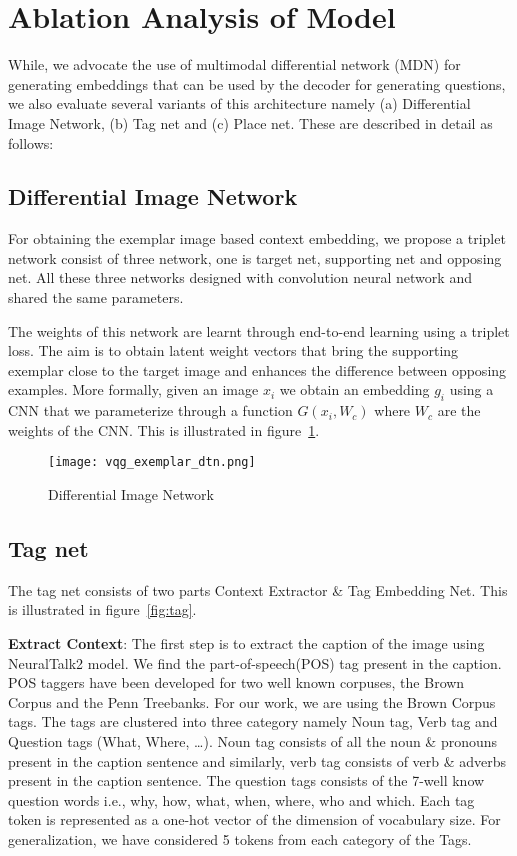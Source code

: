 \documentclass[11pt,a4paper]{article}
\begin{document}
\section{Ablation Analysis of Model}

\label{sec-4}
 While,  we  advocate  the  use  of  multimodal  differential network (MDN) for generating embeddings that can be used by the decoder for generating questions, we also evaluate several variants of this architecture namely (a) Differential Image Network, (b) Tag net and  (c) Place net. These are described in detail as follows:

\subsection{Differential Image Network}


For obtaining the exemplar image based context embedding, we propose a triplet network consist of three network, one is target net, supporting net and opposing net.  All these three networks designed with convolution neural network and shared the same parameters.

The weights of this network are learnt through end-to-end learning using  a triplet loss.  The aim is to obtain latent weight vectors that bring the supporting exemplar close to the target image  and enhances the difference between opposing examples.  More formally, given an image $x_i$ we obtain an embedding $g_i$ using a CNN that we parameterize through a function $G(x_i,W_c)$ where $W_c$ are the weights of the CNN. This is illustrated in  figure~\ref{fig:DTN}.   
\begin{figure}[ht]
\centering
\texttt{[image: vqg\_exemplar\_dtn.png]}
	\caption{ Differential Image Network }
	\label{fig:DTN}
\end{figure}










\subsection{Tag net}
\label{sec:tag}
The tag net consists of two parts Context Extractor \& Tag Embedding Net. This is illustrated in figure~\ref{fig:tag}.

\textbf{Extract Context}:
The first step is to extract the caption of the image using NeuralTalk2 \cite{Karpathy_NIPS2014} model. We find the part-of-speech(POS) tag present in the caption. POS taggers have been developed for two well known corpuses, the Brown Corpus and the Penn Treebanks. For our work, we are using the Brown Corpus tags. The tags are clustered into three category namely Noun tag, Verb tag and Question tags (What, Where, \dots). Noun tag consists of all the noun \& pronouns present in the caption sentence and similarly, verb tag consists of verb \& adverbs present in the caption sentence. The question tags consists of the 7-well know question words {i.e., why, how, what, when, where, who and which}. Each tag token is represented as a one-hot vector of the dimension of vocabulary size. For generalization, we have considered 5 tokens from each category of the Tags.
\end{document}
